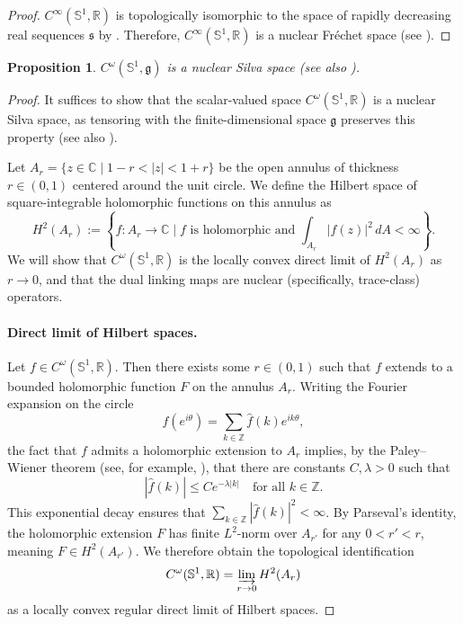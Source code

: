 \documentclass[11pt,reqno]{amsart}
\newtheorem{proposition}[theorem]{Proposition}
\theoremstyle{definition}
\numberwithin{equation}{section}
\begin{document}
\begin{proof}
 $C^{\infty}(\mathbb{S}^1, \mathbb{R})$ is topologically isomorphic to the space of rapidly decreasing real sequences $\mathfrak s$ by \cite[Theorem 51.3]{31}. Therefore, $C^{\infty}(\mathbb{S}^1, \mathbb{R})$ is a nuclear Fréchet space (see \cite[Remark 51.1]{31}).
\end{proof}


\begin{proposition}
$C^{\omega}(\mathbb{S}^1, \mathfrak{g})$ is a nuclear Silva space (see also \cite[Lemma 30.3]{20}).
\end{proposition}

\begin{proof}
It suffices to show that the scalar-valued space $C^{\omega}(\mathbb{S}^1, \mathbb{R})$ is a nuclear Silva space, as tensoring with the finite-dimensional space $\mathfrak{g}$ preserves this property (see also \cite[Theorem 11.4]{20}). 

Let $A_r = \{z \in \mathbb{C} \mid 1-r < |z| < 1+r\}$ be the open annulus of thickness $r \in (0, 1)$ centered around the unit circle. We define the Hilbert space of square-integrable holomorphic functions on this annulus as
\[
H^2(A_r) := \left\{ f : A_r \rightarrow \mathbb{C} \mid f \text{ is holomorphic and } \int_{A_r} |f(z)|^2 \, dA < \infty \right\}.
\]
We will show that $C^{\omega}(\mathbb{S}^1, \mathbb{R})$ is the locally convex direct limit of $H^2(A_r)$ as $r \to 0$, and that the dual linking maps are nuclear (specifically, trace-class) operators.

\paragraph{Direct limit of Hilbert spaces.}
Let $f \in C^{\omega}(\mathbb{S}^1, \mathbb{R})$. Then there exists some $r \in (0, 1)$ such that $f$ extends to a bounded holomorphic function $F$ on the annulus $A_r$. Writing the Fourier expansion on the circle
\[
f(e^{i\theta}) = \sum_{k \in \mathbb{Z}} \hat{f}(k)e^{ik\theta},
\]
the fact that $f$ admits a holomorphic extension to $A_r$ implies, by the Paley–Wiener theorem (see, for example, \cite[Theorem 3.1]{29}), that there are constants $C, \lambda > 0$ such that
\[
|\hat{f}(k)| \le Ce^{-\lambda|k|} \quad \text{for all } k \in \mathbb{Z}.
\]
This exponential decay ensures that $\sum_{k \in \mathbb{Z}} |\hat{f}(k)|^2 < \infty$. By Parseval’s identity, the holomorphic extension $F$ has finite $L^2$-norm over $A_{r'}$ for any $0 < r' < r$, meaning $F \in H^2(A_{r'})$. We therefore obtain the topological identification
\[
C^{\omega}(\mathbb{S}^1, \mathbb{R}) = \varinjlim_{r \to 0} H^2(A_r)
\]
as a locally convex regular direct limit of Hilbert spaces.


\end{proof}
\end{document}

